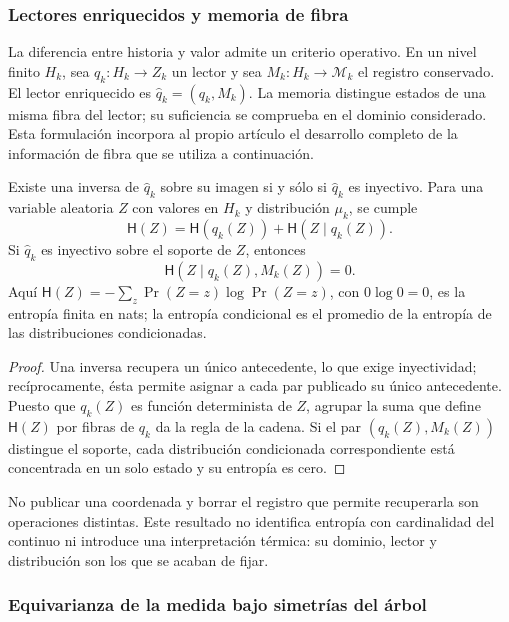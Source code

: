 \subsubsection{Lectores enriquecidos y memoria de fibra}
\label{sec:ch-memoria-fibra}

La diferencia entre historia y valor admite un criterio operativo. En un
nivel finito \(H_k\), sea \(q_k:H_k\to Z_k\) un lector y sea
\(M_k:H_k\to\mathcal M_k\) el registro conservado. El lector enriquecido
es \(\widehat q_k=(q_k,M_k)\). La memoria distingue estados de una misma
fibra del lector; su suficiencia se comprueba en el dominio considerado.
Esta formulación incorpora al propio artículo el desarrollo completo de la
información de fibra que se utiliza a continuación.

\begin{proposition}
\label{prop:ch-recuperabilidad-fibra}
Existe una inversa de \(\widehat q_k\) sobre su imagen si y sólo si
\(\widehat q_k\) es inyectivo. Para una variable aleatoria \(Z\) con
valores en \(H_k\) y distribución \(\mu_k\), se cumple
\[
 \mathsf H(Z)=\mathsf H(q_k(Z))+\mathsf H(Z\mid q_k(Z)).
\]
Si \(\widehat q_k\) es inyectivo sobre el soporte de \(Z\), entonces
\[
 \mathsf H(Z\mid q_k(Z),M_k(Z))=0.
\]
Aquí \(\mathsf H(Z)=-\sum_z\Pr(Z=z)\log\Pr(Z=z)\), con
\(0\log0=0\), es la entropía finita en nats; la entropía condicional es
el promedio de la entropía de las distribuciones condicionadas.
\end{proposition}

\begin{proof}
Una inversa recupera un único antecedente, lo que exige inyectividad;
recíprocamente, ésta permite asignar a cada par publicado su único
antecedente. Puesto que \(q_k(Z)\) es función determinista de \(Z\),
agrupar la suma que define \(\mathsf H(Z)\) por fibras de \(q_k\) da la
regla de la cadena. Si el par \((q_k(Z),M_k(Z))\) distingue el soporte,
cada distribución condicionada correspondiente está concentrada en un solo
estado y su entropía es cero.
\end{proof}

No publicar una coordenada y borrar el registro que permite recuperarla son
operaciones distintas. Este resultado no identifica entropía con cardinalidad
del continuo ni introduce una interpretación térmica: su dominio, lector y
distribución son los que se acaban de fijar.

\subsubsection{Equivarianza de la medida bajo simetrías del árbol}
\label{sec:ch-naturalidad-medida}

